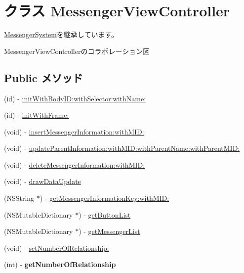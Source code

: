 \hypertarget{interface_messenger_view_controller}{
\section{クラス MessengerViewController}
\label{d7/d34/interface_messenger_view_controller}
}


\hyperlink{interface_messenger_system}{MessengerSystem}を継承しています。



MessengerViewControllerのコラボレーション図
\subsection*{Public メソッド}
\begin{DoxyCompactItemize}
\item 
(id) -\/ \hyperlink{interface_messenger_view_controller_a44c0a2552e50d6223a8230447be3e83a}{initWithBodyID:withSelector:withName:}
\item 
(id) -\/ \hyperlink{interface_messenger_view_controller_a1ac23270dbc04a95b72dd16b2c201c5a}{initWithFrame:}
\item 
(void) -\/ \hyperlink{interface_messenger_view_controller_aa30151ef1d95034a10fa31e9c8a7da22}{insertMessengerInformation:withMID:}
\item 
(void) -\/ \hyperlink{interface_messenger_view_controller_a3eb404c4ef5fc51caae10e71136f35ff}{updateParentInformation:withMID:withParentName:withParentMID:}
\item 
(void) -\/ \hyperlink{interface_messenger_view_controller_ab9c9343a0f520cdc1aa91b3985b31f7a}{deleteMessengerInformation:withMID:}
\item 
(void) -\/ \hyperlink{interface_messenger_view_controller_aba89f37600bb5cc7258a034614257dc6}{drawDataUpdate}
\item 
(NSString $\ast$) -\/ \hyperlink{interface_messenger_view_controller_a9c958b9ee93a81551b3aa4209eaa3c71}{getMessengerInformationKey:withMID:}
\item 
(NSMutableDictionary $\ast$) -\/ \hyperlink{interface_messenger_view_controller_afa883d1d29e91d003087a0f4b839daf3}{getButtonList}
\item 
(NSMutableDictionary $\ast$) -\/ \hyperlink{interface_messenger_view_controller_a2e4617fc57087279158f9df78fab0a87}{getMessengerList}
\item 
(void) -\/ \hyperlink{interface_messenger_view_controller_aa75f66a06d37f03a7d2b51e9c7149051}{setNumberOfRelationship:}
\item 
\hypertarget{interface_messenger_view_controller_aa06b18307f500c793a8493da0969b57b}{
(int) -\/ {\bfseries getNumberOfRelationship}}
\label{d7/d34/interface_messenger_view_controller_aa06b18307f500c793a8493da0969b57b}


\end{DoxyCompactItemize}

